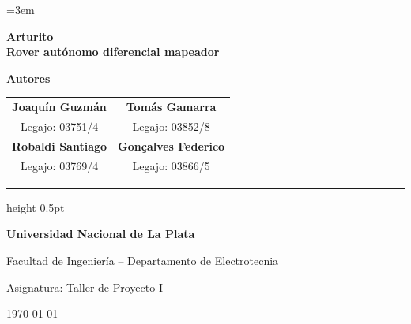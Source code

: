 \documentclass[12pt,a4paper]{article}
\begin{document}

\emergencystretch=3em

\begin{titlepage}
    \thispagestyle{empty}
    \centering
    
    \vspace*{1.5cm}
    
    {\huge \bfseries Arturito\\[0.3em] Rover autónomo diferencial mapeador \par}
    
    \vfill %
    
    {\Large \bfseries Autores \par}
    \vspace{0.6cm}
    \begin{tabular}{c c}
        \textbf{Joaquín Guzmán} & \textbf{Tomás Gamarra} \\
        \small Legajo: 03751/4 & \small Legajo: 03852/8 \\[1.5em]
        \textbf{Robaldi Santiago} & \textbf{Gonçalves Federico} \\
        \small Legajo: 03769/4 & \small Legajo: 03866/5
    \end{tabular}
    
    \vspace{1.5cm}
    
    \hrule height 0.5pt
    \vspace{0.4cm}
    
    {\large \textbf{Universidad Nacional de La Plata}} \par
    \vspace{0.15cm}
    {Facultad de Ingeniería -- Departamento de Electrotecnia} \par
    \vspace{0.15cm}
    {\small Asignatura: Taller de Proyecto I} \par
    \vspace{0.3cm}
    {\small \today}
    
\end{titlepage}
\end{document}
